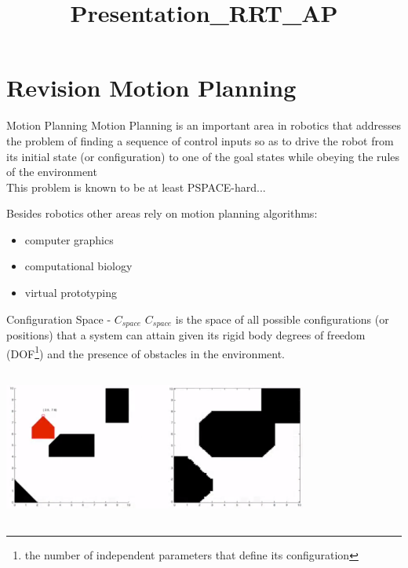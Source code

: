 \documentclass[10pt, xcolor=table]{beamer}
\title{Presentation_RRT_AP}
\begin{document}
\graphicspath{ {images/} }

\maketitle

\section{Revision Motion Planning}

\begin{frame}{Motion Planning}
\justify
Motion Planning is an important area in \alert{robotics} that addresses the problem of finding a sequence of control inputs so as to drive the robot from its initial state (or configuration) to one of the goal states while \alert{obeying the rules of the environment} \cite{karaman2011sampling} \\

This problem is known to be at least PSPACE-hard... %

Besides robotics other areas rely on motion planning algorithms:
\begin{itemize}
\item computer graphics
\item computational biology
\item virtual prototyping
\end{itemize}
\end{frame}

\begin{frame}{Configuration Space - $C_{space}$}
$C_{space}$ is the space of all possible configurations (or positions) that a system can attain given its rigid body degrees of freedom (DOF\footnote[frame]{the number of independent parameters that define its configuration}) and the presence of obstacles in the environment. 

\hspace{1cm}
\includegraphics[width=10cm,height=5cm]{cspace.png} 

\end{frame}
\end{document}
